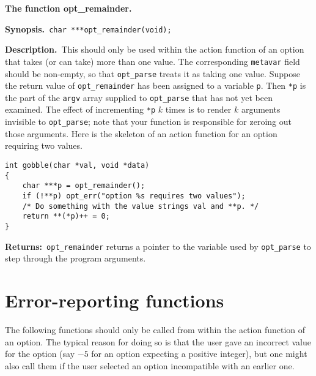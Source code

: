 \documentclass{article}
\newenvironment{chunk}[1]
{\par\smallskip\noindent\textbf{#1.}\par\nopagebreak}
{\par\smallskip}
\renewcommand{\tt}{\texttt}
\newcommand{\synopsis}{\par\noindent\textbf{Synopsis.}}
\newcommand{\descr}{\par\noindent\textbf{Description.}\ }
\newcommand{\return}{\par\noindent\textbf{Returns:}\ }
\begin{document}
\begin{chunk}{The function opt\_remainder}
  \synopsis\verb+ char ***opt_remainder(void);+
  \descr This should only be used within the action function of an
  option that takes (or can take) more than one value. The
  corresponding \tt{metavar} field should be non-empty, so that
  \tt{opt\_parse} treats it as taking one value. Suppose the return
  value of \tt{opt\_remainder} has been assigned to a variable
  \tt{p}. Then \tt{*p} is the part of the \tt{argv} array supplied to
  \tt{opt\_parse} that has not yet been examined. The effect
  of incrementing \tt{*p} $k$ times is to render $k$ arguments
  invisible to \tt{opt\_parse}; note that your function is responsible
  for zeroing out those arguments. Here is the skeleton of an action
  function for an option requiring two values. 
\begin{verbatim}
int gobble(char *val, void *data)
{
    char ***p = opt_remainder();
    if (!**p) opt_err("option %s requires two values");
    /* Do something with the value strings val and **p. */
    return **(*p)++ = 0;
}
\end{verbatim}
  \return \tt{opt\_remainder} returns a pointer to the variable
  used by \tt{opt\_parse} to step through the program arguments.
\end{chunk}
\section{Error-reporting functions}
The following functions should only be called from within the action
function of an option. The typical reason for doing so is that the
user gave an incorrect value for the option (say $-5$ for an option
expecting a positive integer), but one might also call them if the user
selected an option incompatible with an earlier one. 
\end{document}
